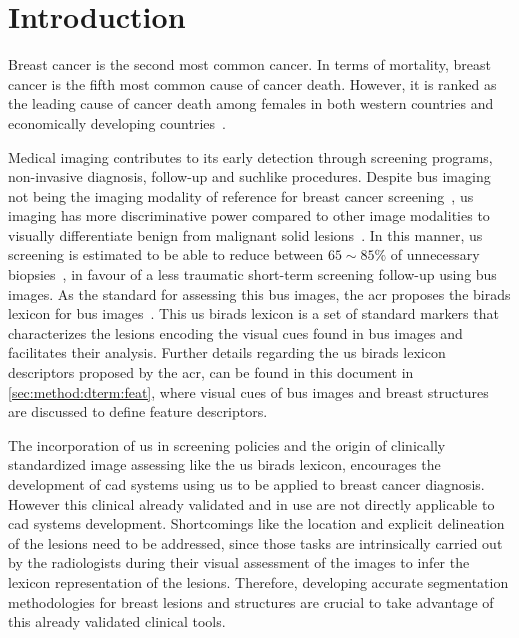 \graphicspath{ {./content/intro/figures/} }

\section{Introduction}
\label{sec:intro}  %


Breast cancer is the second most common cancer.
In terms of mortality, breast cancer is the fifth most common cause of cancer death.
However, it is ranked as the leading cause of cancer death among females in both western countries and economically developing countries~\cite{cancerStatistics2011}.

Medical imaging contributes to its early detection through screening programs, non-invasive diagnosis, follow-up and suchlike procedures.
Despite \ac{bus} imaging not being the imaging modality of reference for breast cancer screening~\cite{smith2003american}, \ac{us} imaging has more discriminative power compared to other image modalities to visually differentiate benign from malignant solid lesions~\cite{Stavros:1995p12392}.
In this manner, \ac{us} screening is estimated to be able to reduce 
between $65\sim85\%$ of unnecessary biopsies~\cite{yuan2010multimodality}, in favour of a less traumatic short-term screening follow-up using \ac{bus} images.
As the standard for assessing this \ac{bus} images, the \ac{acr} proposes the \ac{birads} lexicon for \ac{bus} images~\cite{biradsus}.
This \ac{us} \ac{birads} lexicon is a set of standard markers that characterizes the lesions encoding the visual cues found in \ac{bus} images and facilitates their analysis.
Further details regarding the \ac{us} \ac{birads} lexicon descriptors proposed by the \ac{acr}, can be found in this document in \cref{sec:method:dterm:feat}, where visual cues of \ac{bus} images and breast structures are discussed to define feature descriptors.

The incorporation of \ac{us} in screening policies and the origin of clinically standardized image assessing like the \ac{us} \ac{birads} lexicon, encourages the development of \ac{cad} systems using \ac{us} to be applied to breast cancer diagnosis.
However this clinical already validated and in use are not directly applicable to \ac{cad} systems development. 
Shortcomings like the location and explicit delineation of the lesions need to be addressed, since those tasks are intrinsically carried out by the radiologists during their visual assessment of the images to infer the lexicon representation of the lesions.
Therefore, developing accurate segmentation methodologies for breast lesions and structures are crucial to take advantage of this already validated clinical tools.

